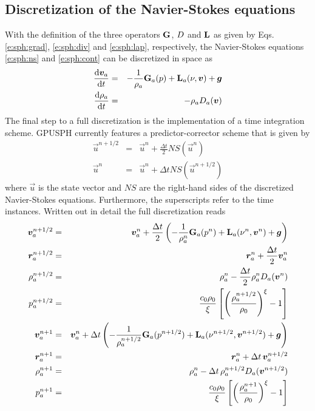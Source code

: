 \documentclass{../GPUSPHtemplate}
\begin{document}
\subsection{Discretization of the Navier-Stokes equations}
With the definition of the three operators $\textbf{G}$, $D$ and $\textbf{L}$ as
given by Eqs. \eqref{e:sph:grad}, \eqref{e:sph:div} and
\eqref{e:sph:lap}, respectively, the Navier-Stokes equations
\eqref{e:sph:ns} and \eqref{e:sph:cont} can be discretized in space as
\begin{eqnarray}
\frac{\text{d} \bm{v}_a}{\text{d} t} &=& - \frac{1}{\rho_a}\textbf{G}_a(p) +
\textbf{L}_a(\nu,\bm{v}) + \bm{g}
\label{e:sph:ns-disc}
\\
\frac{\text{d} \rho_a}{\text{d} t} &=& -\rho_a D_a(\bm{v})
\label{e:sph:cont-disc}
\end{eqnarray}
The final step to a full discretization is the implementation of a time
integration scheme. GPUSPH currently features a predictor-corrector
scheme that is given by
\begin{eqnarray}
\vec{u}^{n+1/2} &=& \vec{u}^n + \frac{\Delta t}{2} NS(\vec{u}^n)
\label{e:sph:pred-corr}
\\
\vec{u}^{n} &=& \vec{u}^n + \Delta t NS(\vec{u}^{n+1/2})
\nonumber
\end{eqnarray}
where $\vec{u}$ is the state vector and $NS$ are the right-hand sides
of the discretized Navier-Stokes equations. Furthermore, the
superscripts refer to the time instances. Written out in detail
the full discretization reads
\begin{eqnarray}
\bm{v}_a^{n+1/2} &=& \bm{v}_a^n + \frac{\Delta t}{2} \left(
-\frac{1}{\rho^n_a}\textbf{G}_a(p^n) + \textbf{L}_a(\nu^n,\bm{v}^n) + \bm{g}
\right)
\label{e:sph:pred-corr-ns}
\\
\bm{r}_a^{n+1/2} &=& \bm{r}_a^{n} + \frac{\Delta t}{2}
\bm{v}_a^{n}
\nonumber
\\
\rho_a^{n+1/2} &=& \rho_a^n - \frac{\Delta t}{2} \rho_a^n
D_a(\bm{v}^n)
\nonumber
\\
p_a^{n+1/2} &=& \frac{c_0 \rho_0}{\xi}\left[ \left( \frac{\rho_a^{n+1/2}}{\rho_0}\right)^\xi
-1 \right]
\nonumber
\\
\bm{v}_a^{n+1} &=& \bm{v}_a^n + \Delta t \left(
-\frac{1}{\rho^{n+1/2}_a}\textbf{G}_a(p^{n+1/2}) +
\textbf{L}_a(\nu^{n+1/2},\bm{v}^{n+1/2}) + \bm{g}
\right)
\nonumber
\\
\bm{r}_a^{n+1} &=& \bm{r}_a^{n} + \Delta t\,
\bm{v}_a^{n+1/2}
\nonumber
\\
\rho_a^{n+1} &=& \rho_a^n - \Delta t\, \rho_a^{n+1/2}
D_a(\bm{v}^{n+1/2})
\nonumber
\\
p_a^{n+1} &=& \frac{c_0 \rho_0}{\xi}\left[ \left( \frac{\rho_a^{n+1}}{\rho_0}\right)^\xi
-1 \right]
\nonumber
\end{eqnarray}
\end{document}
